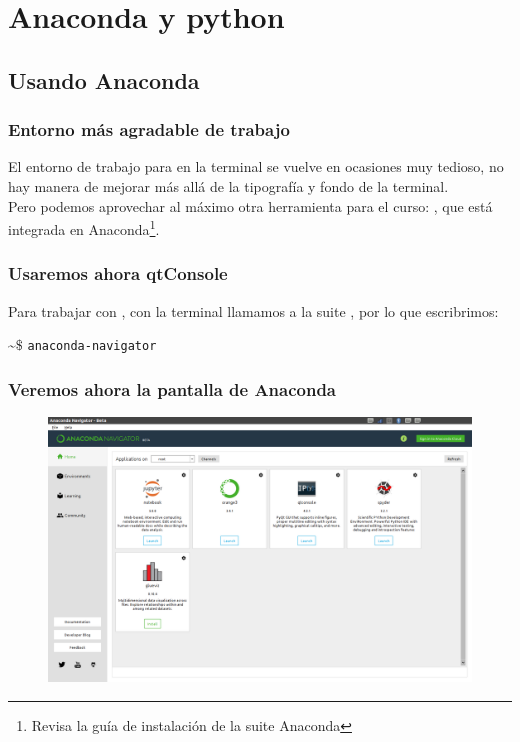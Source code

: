 \section{Anaconda y python}
\subsection{Usando Anaconda}
{
\begin{frame}
\frametitle{Entorno más agradable de trabajo}
El entorno de trabajo para \python{} en la terminal se vuelve en ocasiones muy tedioso, no hay manera de mejorar más allá de la tipografía y fondo de la terminal.
\\
\bigskip
Pero podemos aprovechar al máximo otra herramienta para el curso: , que está integrada en Anaconda\footnote{Revisa la guía de instalación de la suite Anaconda}.
\end{frame}
\begin{frame}
\frametitle{Usaremos ahora qtConsole}
Para trabajar con , con la terminal llamamos a la suite , por lo que escribrimos:
\begin{center}
\textasciitilde $\$$ \texttt{anaconda-navigator} \keys{\return}
\end{center}
\end{frame}
\begin{frame}
\frametitle{Veremos ahora la pantalla de Anaconda}
\begin{figure}
	\centering
	\includegraphics[scale=0.2]{anaconda_01.png}
\end{figure}
\end{frame}
}

